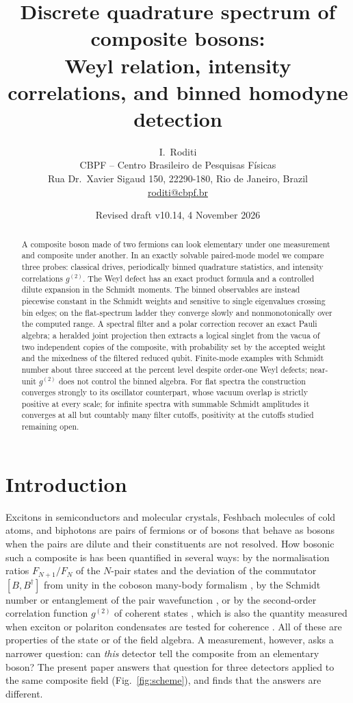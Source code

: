 \documentclass[11pt,a4paper]{article}
\title{Discrete quadrature spectrum of composite bosons:\\ Weyl relation, intensity correlations, and binned homodyne detection}
\author{I.~Roditi\\[4pt]
\small CBPF -- Centro Brasileiro de Pesquisas F\'isicas\\
\small Rua Dr.~Xavier Sigaud 150, 22290-180, Rio de Janeiro, Brazil\\
\small \href{mailto:roditi@cbpf.br}{roditi@cbpf.br}}
\date{Revised draft v10.14, 4 November 2026}
\begin{document}
\maketitle

\begin{abstract}
A composite boson made of two fermions can look elementary under one measurement and composite under another. In an exactly solvable paired-mode model we compare three probes: classical drives, periodically binned quadrature statistics, and intensity correlations $g^{(2)}$. The Weyl defect has an exact product formula and a controlled dilute expansion in the Schmidt moments. The binned observables are instead piecewise constant in the Schmidt weights and sensitive to single eigenvalues crossing bin edges; on the flat-spectrum ladder they converge slowly and nonmonotonically over the computed range. A spectral filter and a polar correction recover an exact Pauli algebra; a heralded joint projection then extracts a logical singlet from the vacua of two independent copies of the composite, with probability set by the accepted weight and the mixedness of the filtered reduced qubit. Finite-mode examples with Schmidt number about three succeed at the percent level despite order-one Weyl defects; near-unit $g^{(2)}$ does not control the binned algebra. For flat spectra the construction converges strongly to its oscillator counterpart, whose vacuum overlap is strictly positive at every scale; for infinite spectra with summable Schmidt amplitudes it converges at all but countably many filter cutoffs, positivity at the cutoffs studied remaining open.
\end{abstract}

\section{Introduction}

Excitons in semiconductors and molecular crystals, Feshbach molecules of cold atoms, and biphotons are pairs of fermions or of bosons that behave as bosons when the pairs are dilute and their constituents are not resolved. How bosonic such a composite is has been quantified in several ways: by the normalisation ratios $F_{N+1}/F_N$ of the $N$-pair states and the deviation of the commutator $[B,B^\dagger]$ from unity in the coboson many-body formalism \cite{Combescot2008,CombescotShiau2015,Shiau2017,Figueiredo2026}, by the Schmidt number or entanglement of the pair wavefunction \cite{Law2005,Chudzicki2010,Tichy2012,Tichy2014}, or by the second-order correlation function $g^{(2)}$ of coherent states \cite{Shiau2017}, which is also the quantity measured when exciton or polariton condensates are tested for coherence \cite{Kasprzak2006,Deng2010,Combescot2017}. All of these are properties of the state or of the field algebra. A measurement, however, asks a narrower question: can \emph{this} detector tell the composite from an elementary boson? The present paper answers that question for three detectors applied to the same composite field (Fig.~\ref{fig:scheme}), and finds that the answers are different.
\end{document}
